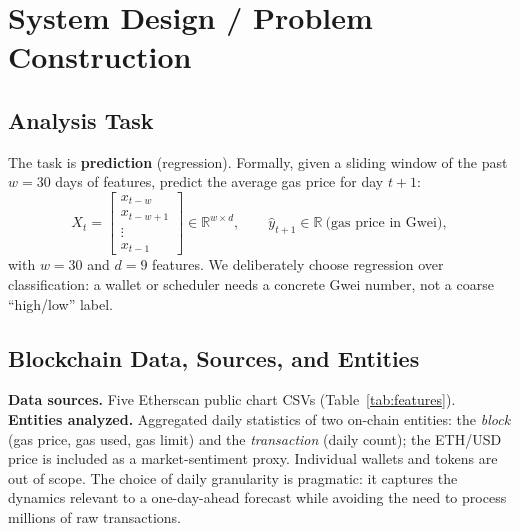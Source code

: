 \documentclass[11pt,a4paper]{article}
\begin{document}
\section{System Design / Problem Construction}

\subsection{Analysis Task}
The task is \textbf{prediction} (regression). Formally, given a sliding window of the past
$w=30$ days of features, predict the average gas price for day $t+1$:
\begin{equation}
X_t = \begin{bmatrix} x_{t-w} \\ x_{t-w+1} \\ \vdots \\ x_{t-1}\end{bmatrix}\in\mathbb{R}^{w\times d},
\qquad \hat{y}_{t+1}\in\mathbb{R}\ \text{(gas price in Gwei)},
\end{equation}
with $w=30$ and $d=9$ features. We deliberately choose regression over classification: a wallet
or scheduler needs a concrete Gwei number, not a coarse ``high/low'' label.

\subsection{Blockchain Data, Sources, and Entities}
\textbf{Data sources.} Five Etherscan public chart CSVs (Table~\ref{tab:features}). \textbf{Entities
analyzed.} Aggregated daily statistics of two on-chain entities: the \emph{block} (gas price, gas
used, gas limit) and the \emph{transaction} (daily count); the ETH/USD price is included as a
market-sentiment proxy. Individual wallets and tokens are out of scope. The choice of daily
granularity is pragmatic: it captures the dynamics relevant to a one-day-ahead forecast while
avoiding the need to process millions of raw transactions.
\end{document}
